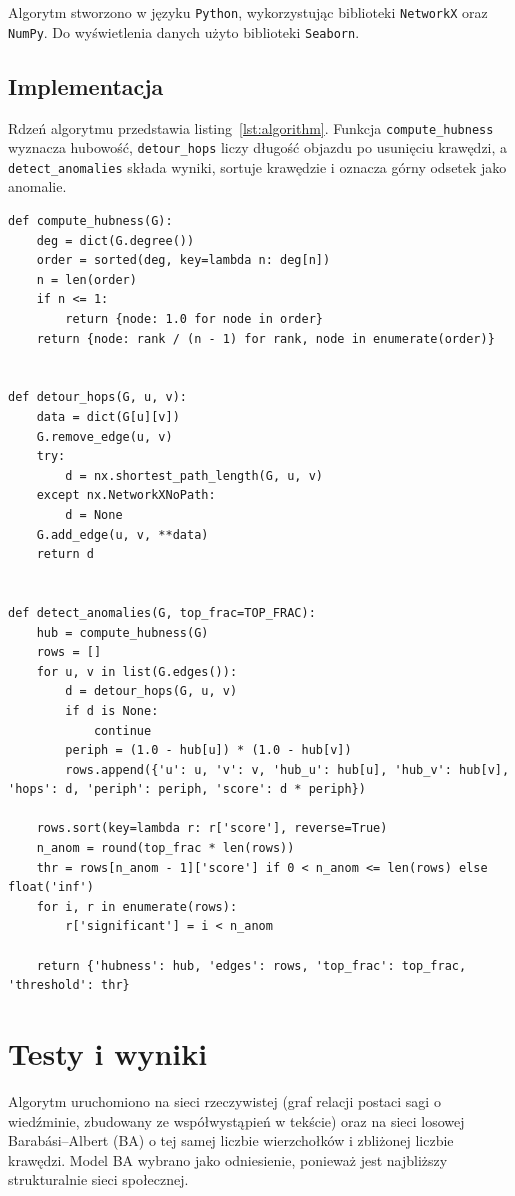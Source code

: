 \documentclass[12pt]{article}
\begin{document}
Algorytm stworzono w języku \texttt{Python}, wykorzystując biblioteki \texttt{NetworkX} oraz \texttt{NumPy}. Do wyświetlenia danych użyto biblioteki \texttt{Seaborn}.

\subsection{Implementacja}

Rdzeń algorytmu przedstawia listing~\ref{lst:algorithm}. Funkcja \texttt{compute\_hubness} wyznacza hubowość, \texttt{detour\_hops} liczy długość objazdu po usunięciu krawędzi, a \texttt{detect\_anomalies} składa wyniki, sortuje krawędzie i oznacza górny odsetek jako anomalie.

\begin{lstlisting}[caption={Rdzeń algorytmu wykrywania anomalnych krawędzi.},label={lst:algorithm}]
def compute_hubness(G):
    deg = dict(G.degree())
    order = sorted(deg, key=lambda n: deg[n])
    n = len(order)
    if n <= 1:
        return {node: 1.0 for node in order}
    return {node: rank / (n - 1) for rank, node in enumerate(order)}


def detour_hops(G, u, v):
    data = dict(G[u][v])
    G.remove_edge(u, v)
    try:
        d = nx.shortest_path_length(G, u, v)
    except nx.NetworkXNoPath:
        d = None
    G.add_edge(u, v, **data)
    return d


def detect_anomalies(G, top_frac=TOP_FRAC):
    hub = compute_hubness(G)
    rows = []
    for u, v in list(G.edges()):
        d = detour_hops(G, u, v)
        if d is None:
            continue
        periph = (1.0 - hub[u]) * (1.0 - hub[v])
        rows.append({'u': u, 'v': v, 'hub_u': hub[u], 'hub_v': hub[v], 'hops': d, 'periph': periph, 'score': d * periph})

    rows.sort(key=lambda r: r['score'], reverse=True)
    n_anom = round(top_frac * len(rows))
    thr = rows[n_anom - 1]['score'] if 0 < n_anom <= len(rows) else float('inf')
    for i, r in enumerate(rows):
        r['significant'] = i < n_anom

    return {'hubness': hub, 'edges': rows, 'top_frac': top_frac, 'threshold': thr}
\end{lstlisting}

\section{Testy i wyniki}

Algorytm uruchomiono na sieci rzeczywistej (graf relacji postaci sagi o wiedźminie, zbudowany ze współwystąpień w tekście) oraz na sieci losowej Barabási--Albert (BA) o tej samej liczbie wierzchołków i zbliżonej liczbie krawędzi. Model BA wybrano jako odniesienie, ponieważ jest najbliższy strukturalnie sieci społecznej.
\end{document}

